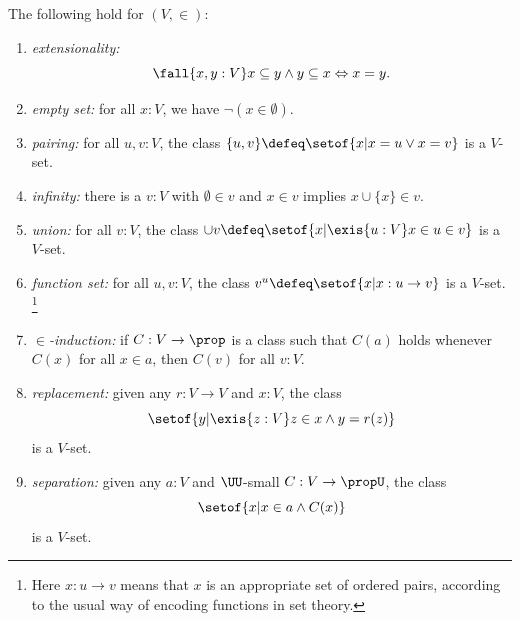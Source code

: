 %
\begin{thm}\label{thm:VisCST}
  The following hold for $(V, {\in})$:
  \begin{enumerate}
  \item \emph{extensionality:}
    \begin{equation*}
      \fall{x, y : V} x \subseteq y \land y \subseteq x \Leftrightarrow x = y.
    \end{equation*}
     \item \emph{empty set:} for all $x:V$, we have $\neg (x\in \emptyset)$.
    \item \emph{pairing:} for all $u, v:V$, the class $\{u, v\} \defeq \setof{ x | x = u \vee x = v}$ is a $V$-set.
    \item \emph{infinity:}  there is a $v:V$ with $\emptyset\in v$ and $x\in v$ implies $x\cup \{x\}\in v$.
  \item \emph{union:} for all $v:V$, the class $\cup v\defeq \setof{ x | \exis{u:V} x \in u \in v}$ is a $V$-set.
    \item \emph{function set:} for all $u, v:V$, the class $v^u \defeq \setof{ x | x : u\to v}$ is a $V$-set.%
      \footnote{Here $x:u\to v$ means that $x$ is an appropriate set of ordered pairs, according to the usual way of encoding functions in set theory.}
   \item \emph{$\in$-induction:} if $C : V \to \prop$ is a class such that $C(a)$ holds whenever $C(x)$ for all $x\in a$, then $C(v)$ for all $v:V$.
     \item \emph{replacement:} given any $r : V \to V$ and $x : V$, the class
       \begin{equation*}
         \setof{ y | \exis{z : V} z \in x \land y = r(z)}
       \end{equation*}
       is a $V$-set.
   \item \emph{separation:}  given any $a : V$ and $\UU$-small $C : V \to \propU$, the class
     \begin{equation*}
       \setof{ x | x \in a \land C(x)}
     \end{equation*}
     is a $V$-set.
  \end{enumerate}
\end{thm}


